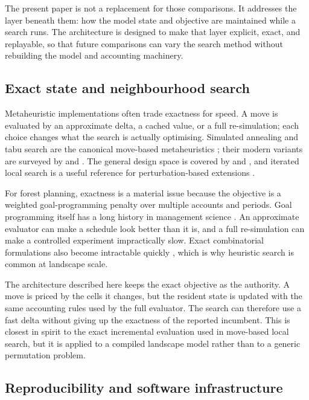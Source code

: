 \documentclass[preprint,11pt]{elsarticle}
\begin{document}
The present paper is not a replacement for those comparisons. It addresses the layer beneath them: how
the model state and objective are maintained while a search runs. The architecture is designed to make
that layer explicit, exact, and replayable, so that future comparisons can vary the search method
without rebuilding the model and accounting machinery.

\subsection{Exact state and neighbourhood search}\label{exact-state-and-neighbourhood-search}

Metaheuristic implementations often trade exactness for speed. A move is evaluated by an approximate
delta, a cached value, or a full re-simulation; each choice changes what the search is actually
optimising. Simulated annealing and tabu search are the canonical move-based metaheuristics
\citep{kirkpatrick1983,glover1989}; their modern variants are surveyed by \citet{blum2003} and
\citet{boussaid2013}. The general design space is covered by \citet{hoos2004} and \citet{talbi2009},
and iterated local search is a useful reference for perturbation-based extensions
\citep{lourenco2003}.

For forest planning, exactness is a material issue because the objective is a weighted
goal-programming penalty over multiple accounts and periods. Goal programming itself has a long
history in management science \citep{charnes1961,ignizio1976,romero1991}. An approximate evaluator
can make a schedule look better than it is, and a full re-simulation can make a controlled experiment
impractically slow. Exact combinatorial formulations also become intractable quickly
\citep{garey1979,wolsey1998}, which is why heuristic search is common at landscape scale.

The architecture described here keeps the exact objective as the authority. A move is priced by the
cells it changes, but the resident state is updated with the same accounting rules used by the full
evaluator. The search can therefore use a fast delta without giving up the exactness of the reported
incumbent. This is closest in spirit to the exact incremental evaluation used in move-based local
search, but it is applied to a compiled landscape model rather than to a generic permutation
problem.

\subsection{Reproducibility and software infrastructure}\label{reproducibility-and-software-infrastructure}
\end{document}
